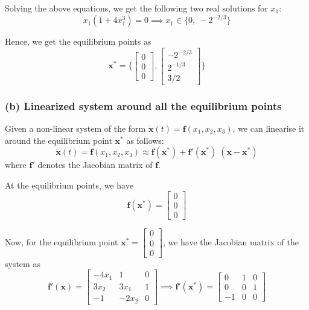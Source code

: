 Solving the above equations, we get the following two real solutions for \( x_1 \):
\[
    x_1(1 + 4x_1^3) = 0
    \implies
    x_1 \in \{ 0, \ -2^{-2/3} \}
\]

Hence, we get the equilibrium points as
\[
    \boxed{
        \mathbf{x^*} =
        \Bigg \{
        \begin{bmatrix}
            0 \\
            0 \\
            0
        \end{bmatrix},
        \begin{bmatrix}
            -2^{-2/3} \\
            2^{-1/3}  \\
            3/2
        \end{bmatrix}
        \Bigg \}
    }
\]

\subsubsection*{(b) Linearized system around all the equilibrium points}

Given a non-linear system of the form \( \mathbf{\dot x}(t) = \mathbf{f}(x_1, x_2, x_3) \), we can linearise it around the equilibrium point \( \mathbf{x^*} \) as follows:
\[
    \mathbf{\dot x}(t) = \mathbf{f}(x_1, x_2, x_3) \approx \mathbf{f}(\mathbf{x^*}) + \mathbf{f'}(\mathbf{x^*})\; (\mathbf{x} - \mathbf{x^*})
\]
where \(\mathbf{f'}\) denotes the Jacobian matrix of \(\mathbf{f}\).

At the equilibrium points, we have
\[
    \mathbf{f}(\mathbf{x^*}) =
    \begin{bmatrix}
        0 \\
        0 \\
        0
    \end{bmatrix}
\]

Now, for the equilibrium point \( \mathbf{x^*} = \begin{bmatrix} 0 \\ 0 \\ 0 \end{bmatrix} \), we have the Jacobian matrix of the system as
\[
    \mathbf{f'}(\mathbf{x}) =
    \begin{bmatrix}
        -4x_1 & 1     & 0 \\
        3x_2  & 3x_1  & 1 \\
        -1    & -2x_2 & 0
    \end{bmatrix}
    \implies
    \mathbf{f'}(\mathbf{x^*}) =
    \begin{bmatrix}
        0  & 1 & 0 \\
        0  & 0 & 1 \\
        -1 & 0 & 0
    \end{bmatrix}
\]

